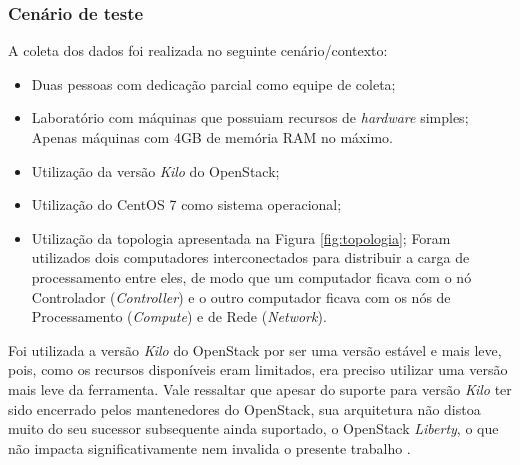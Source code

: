 \documentclass[conference]{IEEEtran}
\begin{document}
    \subsubsection{\textbf{Cenário de teste}} \label{cenario}
	
	A coleta dos dados foi realizada no seguinte cenário/contexto:
	
	\begin{itemize}
	 \item Duas pessoas com dedicação parcial como equipe de coleta; %
	 \item Laboratório com máquinas que possuiam recursos de \textit{hardware} simples;
	    \subitem Apenas máquinas com 4GB de memória RAM no máximo.
	 \item Utilização da versão \textit{Kilo} do OpenStack;
	 \item Utilização do CentOS 7 \cite{centos} como sistema operacional;
	 \item Utilização da topologia apresentada na Figura \ref{fig:topologia};
	    \subitem Foram utilizados dois computadores interconectados para distribuir a carga de processamento entre eles, 
		     de modo que um computador ficava com o nó Controlador (\textit{Controller}) e o outro computador ficava
		     com os nós de Processamento (\textit{Compute}) e de Rede (\textit{Network}).
	\end{itemize}
	
	Foi utilizada a versão \textit{Kilo} \cite{openstack_kilo} do OpenStack por ser uma versão estável e mais leve, pois, como
	os recursos disponíveis eram limitados, era preciso utilizar uma versão mais leve da ferramenta. Vale ressaltar que apesar do
	suporte para versão \textit{Kilo} ter sido encerrado pelos mantenedores do OpenStack, sua arquitetura não distoa muito do seu 
	sucessor subsequente ainda suportado, o OpenStack \textit{Liberty}, o que não impacta significativamente nem invalida
	o presente trabalho \cite{openstack_liberty}.
	

	
    
\end{document}
